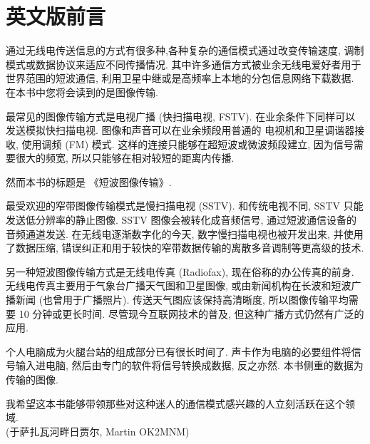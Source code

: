 \chapter*{英文版前言}

通过无线电传送信息的方式有很多种,各种复杂的通信模式通过改变传输速度, 调制模式或数据协议来适应不同传播情况. 其中许多通信方式被业余无线电爱好者用于世界范围的短波通信, 利用卫星中继或是高频率上本地的分包信息网络下载数据. 在本书中您将会读到的是图像传输. 

最常见的图像传输方式是电视广播 (快扫描电视, FSTV). 在业余条件下同样可以发送模拟快扫描电视. 图像和声音可以在业余频段用普通的
电视机和卫星调谐器接收, 使用调频 (FM) 模式. 这样的连接只能够在超短波或微波频段建立, 因为信号需要很大的频宽, 所以只能够在相对较短的距离内传播. 

然而本书的标题是 《短波图像传输》. 

最受欢迎的窄带图像传输模式是慢扫描电视 (SSTV). 和传统电视不同, SSTV 只能发送低分辨率的静止图像. SSTV 图像会被转化成音频信号, 通过短波通信设备的音频通道发送. 在无线电逐渐数字化的今天, 数字慢扫描电视也被开发出来, 并使用了数据压缩, 错误纠正和用于较快的窄带数据传输的离散多音调制等更高级的技术. 

另一种短波图像传输方式是无线电传真 (Radiofax), 现在俗称的办公传真的前身. 无线电传真主要用于气象台广播天气图和卫星图像, 或由新闻机构在长波和短波广播新闻 (也曾用于广播照片). 传送天气图应该保持高清晰度, 所以图像传输平均需要 10 分钟或更长时间. 尽管现今互联网技术的普及, 但这种广播方式仍然有广泛的应用. 

个人电脑成为火腿台站的组成部分已有很长时间了. 声卡作为电脑的必要组件将信号输入进电脑, 然后由专门的软件将信号转换成数据, 反之亦然. 本书侧重的数据为传输的图像. 

我希望这本书能够带领那些对这种迷人的通信模式感兴趣的人立刻活跃在这个领域. \\[1cm]

(于萨扎瓦河畔日贾尔, Martin OK2MNM)